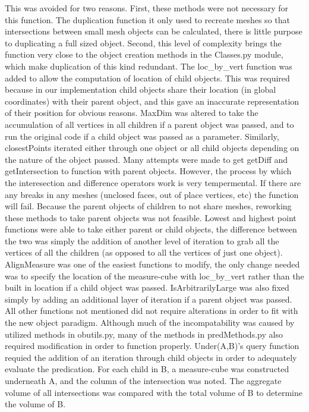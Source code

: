 This was avoided for two reasons. First, these methods were not necessary for this function. The  duplication function it only used to recreate meshes so that intersections between small mesh objects can be calculated, there is little purpose to duplicating a full sized object. Second, this level of complexity brings the function very close to the object creation methods in the Classes.py module, which make duplication of this kind redundant.
The loc\_by\_vert function was added to allow the computation of location of child objects. This was required because in our implementation child objects share their location (in global coordinates) with their parent object, and this gave an inaccurate representation of their position for obvious reasons.
MaxDim was altered to take the accumulation of all vertices in all children if a parent object was passed, and to run the original code if a child object was passed as a parameter. Similarly, closestPoints iterated either through one object or all child objects depending on the nature of the object passed.
Many attempts were made to get getDiff and getIntersection to function with parent objects. However, the process by which the interesection and difference operators work is very tempermental. If there are any breaks in any meshes (unclosed faces, out of place vertices, etc) the function will fail. Because the parent objects of children to not share meshes, reworking these methods to take parent objects was not feasible.
Lowest and highest point functions were able to take either parent or child objects, the difference between the two was simply the addition of another level of iteration to grab all the vertices of all the children (as opposed to all the vertices of just one object). AlignMeasure was one of the easiest functions to modify, the only change needed was to specify the location of the measure-cube with loc\_by\_vert rather than the built in location if a child object was passed. IsArbitrarilyLarge was also fixed simply by adding an additional layer of iteration if a parent object was passed. All other functions not mentioned did not require alterations in order to fit with the new object paradigm.
Although much of the incompatability was caused by utilized methods in obutils.py, many of the methods in predMethods.py also required modification in order to function properly. Under(A,B)'s query function requied the addition of an iteration through child objects in order to adequately evaluate the predication. For each child in B, a measure-cube was constructed underneath A, and the column of the intersection was noted. The aggregate volume of all intersections was compared with the total volume of B to determine the volume of B.
